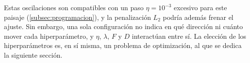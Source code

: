 Estas oscilaciones son compatibles con un paso $\eta=10^{-3}$ excesivo para este paisaje (\cref{subsec:programacion}), y la penalización $L_2$ podría además frenar el ajuste. Sin embargo, una sola configuración no indica en qué dirección ni cuánto mover cada hiperparámetro, y $\eta$, $\lambda$, $F$ y $D$ interactúan entre sí. La elección de los hiperparámetros es, en sí misma, un problema de optimización, al que se dedica la siguiente sección.
